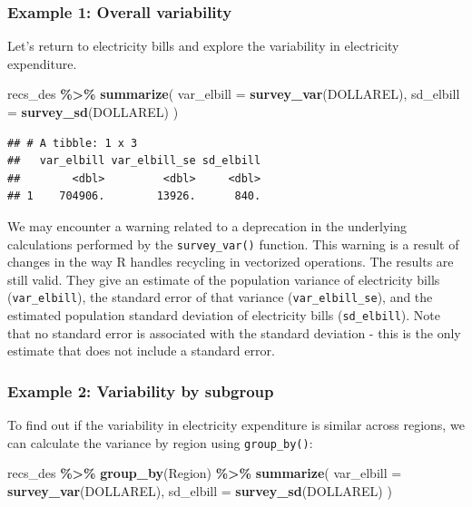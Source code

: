 \documentclass[
]{krantz}
\makeatletter
\newenvironment{Shaded}{\begin{snugshade}}{\end{snugshade}}
\newcommand{\AttributeTok}[1]{\textcolor[rgb]{0.27,0.27,0.27}{#1}}
\newcommand{\FunctionTok}[1]{\textcolor[rgb]{0.27,0.27,0.27}{\textbf{#1}}}
\newcommand{\NormalTok}[1]{#1}
\newcommand{\SpecialCharTok}[1]{\textcolor[rgb]{0.43,0.43,0.43}{\textbf{#1}}}
\newenvironment{kframe}{%
\medskip{}
\setlength{\fboxsep}{.8em}
 \def\at@end@of@kframe{}%
 \ifinner\ifhmode%
  \def\at@end@of@kframe{\end{minipage}}%
  \begin{minipage}{\columnwidth}%
 \fi\fi%
 \def\FrameCommand##1{\hskip\@totalleftmargin \hskip-\fboxsep
 \colorbox{shadecolor}{##1}\hskip-\fboxsep
     \hskip-\linewidth \hskip-\@totalleftmargin \hskip\columnwidth}%
 \MakeFramed {\advance\hsize-\width
   \@totalleftmargin\z@ \linewidth\hsize
   \@setminipage}}%
 {\par\unskip\endMakeFramed%
 \at@end@of@kframe}
\renewenvironment{Shaded}{\begin{kframe}}{\end{kframe}}
\makeatother
\begin{document}
\hypertarget{example-1-overall-variability}{%
\subsubsection*{Example 1: Overall variability}\label{example-1-overall-variability}}


Let's return to electricity bills and explore the variability in electricity expenditure.

\begin{Shaded}
\begin{Highlighting}[]
\NormalTok{recs\_des }\SpecialCharTok{\%\textgreater{}\%}
  \FunctionTok{summarize}\NormalTok{(}
    \AttributeTok{var\_elbill =} \FunctionTok{survey\_var}\NormalTok{(DOLLAREL),}
    \AttributeTok{sd\_elbill =} \FunctionTok{survey\_sd}\NormalTok{(DOLLAREL)}
\NormalTok{  )}
\end{Highlighting}
\end{Shaded}

\begin{verbatim}
## # A tibble: 1 x 3
##   var_elbill var_elbill_se sd_elbill
##        <dbl>         <dbl>     <dbl>
## 1    704906.        13926.      840.
\end{verbatim}

We may encounter a warning related to a deprecation in the underlying calculations performed by the \texttt{survey\_var()} function. This warning is a result of changes in the way R handles recycling in vectorized operations. The results are still valid. They give an estimate of the population variance of electricity bills (\texttt{var\_elbill}), the standard error of that variance (\texttt{var\_elbill\_se}), and the estimated population standard deviation of electricity bills (\texttt{sd\_elbill}). Note that no standard error is associated with the standard deviation - this is the only estimate that does not include a standard error.

\hypertarget{example-2-variability-by-subgroup}{%
\subsubsection*{Example 2: Variability by subgroup}\label{example-2-variability-by-subgroup}}


To find out if the variability in electricity expenditure is similar across regions, we can calculate the variance by region using \texttt{group\_by()}:

\begin{Shaded}
\begin{Highlighting}[]
\NormalTok{recs\_des }\SpecialCharTok{\%\textgreater{}\%}
  \FunctionTok{group\_by}\NormalTok{(Region) }\SpecialCharTok{\%\textgreater{}\%}
  \FunctionTok{summarize}\NormalTok{(}
    \AttributeTok{var\_elbill =} \FunctionTok{survey\_var}\NormalTok{(DOLLAREL),}
    \AttributeTok{sd\_elbill =} \FunctionTok{survey\_sd}\NormalTok{(DOLLAREL)}
\NormalTok{  )}
\end{Highlighting}
\end{Shaded}
\end{document}
